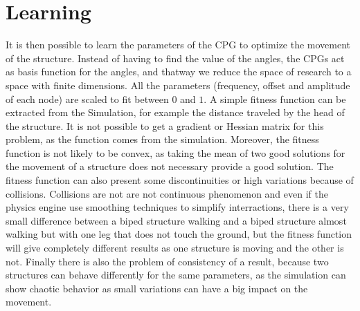 
\chapter{Learning} %

\label{Chapter 4} %


It is then possible to learn the parameters of the CPG to optimize the movement of the structure. Instead of having to find the value of the angles, the CPGs act as basis function for the angles, and thatway we reduce the space of research to a space with finite dimensions. All the parameters (frequency, offset and amplitude of each node) are scaled to fit between $0$ and $1$. A simple fitness function can be extracted from the Simulation, for example the distance traveled by the head of the structure. It is not possible to get a gradient or Hessian matrix for this problem, as the function comes from the simulation. Moreover, the fitness function is not likely to be convex, as taking the mean of two good solutions for the movement of a structure does not necessary provide a good solution. The fitness function can also present some discontinuities or high variations because of collisions. Collisions are not are not continuous phenomenon and even if the physics engine use smoothing techniques to simplify interractions, there is a very small difference between a biped structure walking and a biped structure almost walking but with one leg that does not touch the ground, but the fitness function will give completely different results as one structure is moving and the other is not. Finally there is also the problem of consistency of a result, because two structures can behave differently for the same parameters, as the simulation can show chaotic behavior as small variations can have a big impact on the movement. 

